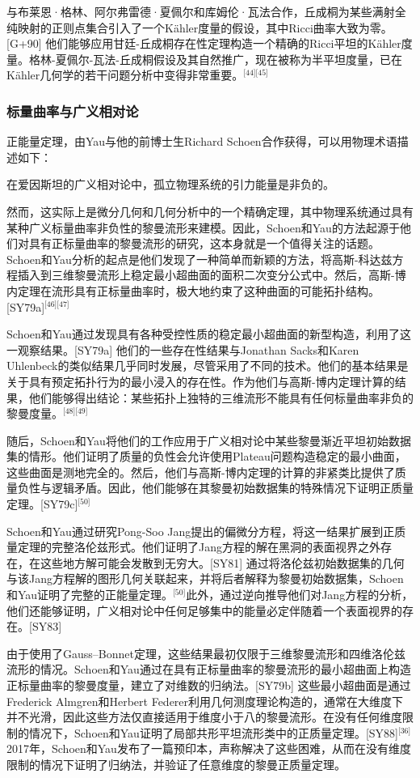 与布莱恩·格林、阿尔弗雷德·夏佩尔和库姆伦·瓦法合作，丘成桐为某些满射全纯映射的正则点集合引入了一个Kähler度量的假设，其中Ricci曲率大致为零。[G+90] 他们能够应用甘廷-丘成桐存在性定理构造一个精确的Ricci平坦的Kähler度量。格林-夏佩尔-瓦法-丘成桐假设及其自然推广，现在被称为半平坦度量，已在Kähler几何学的若干问题分析中变得非常重要。\(^\text{[44][45]}\)
\subsubsection{标量曲率与广义相对论}
正能量定理，由Yau与他的前博士生Richard Schoen合作获得，可以用物理术语描述如下：

在爱因斯坦的广义相对论中，孤立物理系统的引力能量是非负的。

然而，这实际上是微分几何和几何分析中的一个精确定理，其中物理系统通过具有某种广义标量曲率非负性的黎曼流形来建模。因此，Schoen和Yau的方法起源于他们对具有正标量曲率的黎曼流形的研究，这本身就是一个值得关注的话题。Schoen和Yau分析的起点是他们发现了一种简单而新颖的方法，将高斯-科达兹方程插入到三维黎曼流形上稳定最小超曲面的面积二次变分公式中。然后，高斯-博内定理在流形具有正标量曲率时，极大地约束了这种曲面的可能拓扑结构。[SY79a]\(^\text{[46][47]}\)

Schoen和Yau通过发现具有各种受控性质的稳定最小超曲面的新型构造，利用了这一观察结果。[SY79a] 他们的一些存在性结果与Jonathan Sacks和Karen Uhlenbeck的类似结果几乎同时发展，尽管采用了不同的技术。他们的基本结果是关于具有预定拓扑行为的最小浸入的存在性。作为他们与高斯-博内定理计算的结果，他们能够得出结论：某些拓扑上独特的三维流形不能具有任何标量曲率非负的黎曼度量。\(^\text{[48][49]}\)

随后，Schoen和Yau将他们的工作应用于广义相对论中某些黎曼渐近平坦初始数据集的情形。他们证明了质量的负性会允许使用Plateau问题构造稳定的最小曲面，这些曲面是测地完全的。然后，他们与高斯-博内定理的计算的非紧类比提供了质量负性与逻辑矛盾。因此，他们能够在其黎曼初始数据集的特殊情况下证明正质量定理。[SY79c]\(^\text{[50]}\)

Schoen和Yau通过研究Pong-Soo Jang提出的偏微分方程，将这一结果扩展到正质量定理的完整洛伦兹形式。他们证明了Jang方程的解在黑洞的表面视界之外存在，在这些地方解可能会发散到无穷大。[SY81] 通过将洛伦兹初始数据集的几何与该Jang方程解的图形几何关联起来，并将后者解释为黎曼初始数据集，Schoen和Yau证明了完整的正能量定理。\(^\text{[50]}\)此外，通过逆向推导他们对Jang方程的分析，他们还能够证明，广义相对论中任何足够集中的能量必定伴随着一个表面视界的存在。[SY83]

由于使用了Gauss–Bonnet定理，这些结果最初仅限于三维黎曼流形和四维洛伦兹流形的情况。Schoen和Yau通过在具有正标量曲率的黎曼流形的最小超曲面上构造正标量曲率的黎曼度量，建立了对维数的归纳法。[SY79b] 这些最小超曲面是通过Frederick Almgren和Herbert Federer利用几何测度理论构造的，通常在大维度下并不光滑，因此这些方法仅直接适用于维度小于八的黎曼流形。在没有任何维度限制的情况下，Schoen和Yau证明了局部共形平坦流形类中的正质量定理。[SY88]\(^\text{[36]}\)2017年，Schoen和Yau发布了一篇预印本，声称解决了这些困难，从而在没有维度限制的情况下证明了归纳法，并验证了任意维度的黎曼正质量定理。

